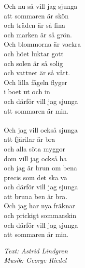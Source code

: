 \vspace{10pt}
Och nu så vill jag sjunga\\
att sommaren är skön\\
och träden är så fina\\
och marken är så grön.\\
Och blommorna är vackra\\
och höet luktar gott\\
och solen är så solig\\
och vattnet är så vått.\\
Och lilla fågeln flyger\\
i boet ut och in\\
och därför vill jag sjunga\\
att sommaren är min.\\
\\
Och jag vill också sjunga\\
att fjärilar är bra\\
och alla söta myggor\\
dom vill jag också ha\\
och jag är brun om bena\\
precis som det ska va\\
och därför vill jag sjunga\\
att bruna ben är bra.\\
Och jag har nya fräknar\\
och prickigt sommarskin\\
och därför vill jag sjunga\\
att sommaren är min.
\par
\vspace{10pt}
{\footnotesize\textit{Text: Astrid Lindgren\\ Musik: George Riedel}}

